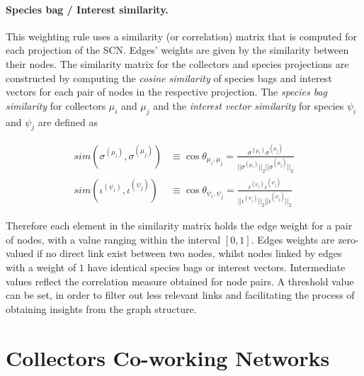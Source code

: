 \paragraph*{Species bag / Interest similarity.}
This weighting rule uses a similarity (or correlation) matrix that is computed for each projection of the SCN. Edges' weights are given by the similarity between their nodes. The similarity matrix for the collectors and species projections are constructed by computing the  \textit{cosine similarity} of species bags and interest vectors  for each pair of nodes in the respective projection. 
The \textit{species bag similarity} for collectors $\mu_i$ and $\mu_j$ and the \textit{interest vector similarity} for species $\psi_i$ and $\psi_j$ are defined as

\begin{equation}
\begin{split}
sim(\sigma^{(\mu_i)},\sigma^{(\mu_j)}) &\equiv
\cos \theta_{\mu_i,\mu_j} =
\frac{  \sigma^{(\mu_i)} \sigma^{(\mu_j)}  }{  ||\sigma^{(\mu_i)}||_2  ||\sigma^{(\mu_j)}||_2  } \\
sim(\iota^{(\psi_i)},\iota^{(\psi_j)}) &\equiv
\cos \theta_{\psi_i,\psi_j} =
\frac{  \iota^{(\psi_i)} \iota^{(\psi_j)}  }{  ||\iota^{(\psi_i)}||_2  ||\iota^{(\psi_j)}||_2  } 
\end{split}
\end{equation}

Therefore each element in the similarity matrix holds the edge weight for a pair of nodes, with a value ranging within the interval $[0,1]$. Edges weights are zero-valued if no direct link exist between two nodes,  whilst nodes linked by edges with a weight of $1$ have identical species bags or interest vectors. Intermediate values reflect the correlation measure obtained for node pairs. A threshold value can be set, in order to filter out less relevant links and facilitating the process of obtaining insights from the graph structure.



\section{Collectors Co-working Networks}


